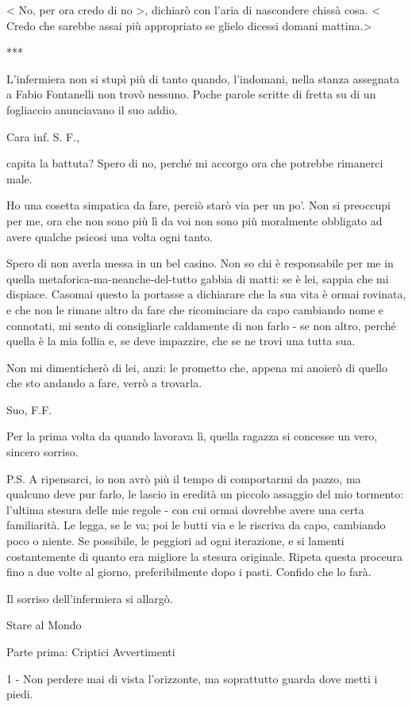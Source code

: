 < No, per ora credo di no >, dichiarò con l'aria di nascondere chissà cosa. < Credo che sarebbe assai più appropriato se glielo dicessi domani mattina.>

***

L'infermiera non si stupì più di tanto quando, l'indomani, nella stanza assegnata a Fabio Fontanelli non trovò nessuno. Poche parole scritte di fretta su di un fogliaccio anunciavano il suo addio.

Cara inf. S. F.,

capita la battuta? Spero di no, perché mi accorgo ora che potrebbe rimanerci male.

Ho una cosetta simpatica da fare, perciò starò via per un po'. Non si preoccupi per me, ora che non sono più lì da voi non sono più moralmente obbligato ad avere qualche psicosi una volta ogni tanto.

Spero di non averla messa in un bel casino. Non so chi è responsabile per me in quella metaforica-ma-neanche-del-tutto gabbia di matti: se è lei, sappia che mi dispiace. Casomai questo la portasse a dichiarare che la sua vita è ormai rovinata, e che non le rimane altro da fare che ricominciare da capo cambiando nome e connotati, mi sento di consigliarle caldamente di non farlo - se non altro, perché quella è la mia follia e, se deve impazzire, che se ne trovi una tutta sua.

Non mi dimenticherò di lei, anzi: le prometto che, appena mi anoierò di quello che sto andando a fare, verrò a trovarla.

Suo,
F.F.

Per la prima volta da quando lavorava lì, quella ragazza si concesse un vero, sincero sorriso.

P.S. A ripensarci, io non avrò più il tempo di comportarmi da pazzo, ma qualcuno deve pur farlo, le lascio in eredità un piccolo assaggio del mio tormento: l'ultima stesura delle mie regole - con cui ormai dovrebbe avere una certa familiarità. Le legga, se le va; poi le butti via e le riscriva da capo, cambiando poco o niente. Se possibile, le peggiori ad ogni iterazione, e si lamenti costantemente di quanto era migliore la stesura originale. Ripeta questa proceura fino a due volte al giorno, preferibilmente dopo i pasti. Confido che lo farà.

Il sorriso dell'infermiera si allargò.

Stare al Mondo

Parte prima: Criptici Avvertimenti

1 - Non perdere mai di vista l’orizzonte, ma soprattutto guarda dove metti i piedi.

